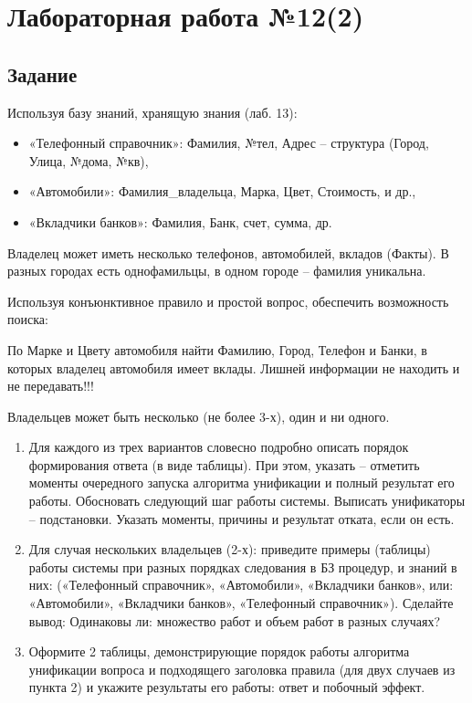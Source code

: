 \documentclass[12pt]{report}
\begin{document}
\chapter*{Лабораторная работа №12(2)}
\section*{Задание}
Используя  базу знаний, хранящую знания (лаб. 13):
\begin{itemize}
	\item «Телефонный справочник»: Фамилия, №тел, Адрес – структура (Город, Улица, №дома, №кв),
	\item «Автомобили»: Фамилия\_владельца, Марка, Цвет, Стоимость, и др.,
	\item «Вкладчики банков»: Фамилия, Банк, счет, сумма, др.
\end{itemize}

Владелец может иметь несколько телефонов, автомобилей, вкладов (Факты). В разных городах есть однофамильцы, в одном городе – фамилия уникальна.

Используя конъюнктивное правило и простой вопрос, обеспечить возможность поиска:

По Марке и Цвету автомобиля найти Фамилию, Город, Телефон и Банки, в которых владелец автомобиля имеет вклады. Лишней информации не находить и не передавать!!!

Владельцев может быть несколько (не более 3-х), один и ни одного.

\begin{enumerate}
	\item Для каждого из трех вариантов словесно подробно описать порядок формирования ответа (в виде таблицы). При этом, указать – отметить моменты очередного запуска алгоритма унификации и полный результат его работы. Обосновать следующий шаг работы системы. Выписать унификаторы – подстановки. Указать моменты, причины и результат отката, если он есть.
	\item Для случая нескольких владельцев (2-х): 
	приведите примеры (таблицы) работы системы при разных порядках следования в БЗ  процедур, и знаний в них: («Телефонный справочник», «Автомобили», «Вкладчики банков», или: «Автомобили», «Вкладчики банков», «Телефонный справочник»). Сделайте вывод: Одинаковы ли: множество работ и объем работ в разных случаях?
	\item Оформите 2 таблицы, демонстрирующие порядок работы алгоритма унификации вопроса и подходящего заголовка правила (для двух случаев из пункта 2) и укажите результаты его работы: ответ и побочный эффект.
\end{enumerate}
\end{document}
